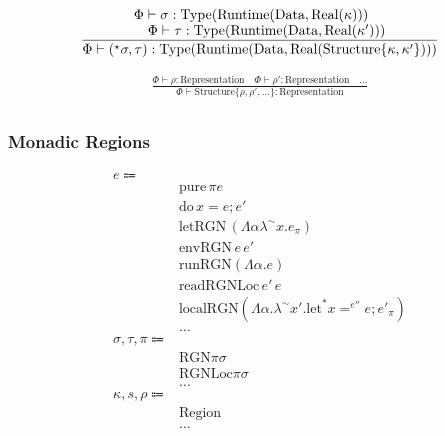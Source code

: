 \documentclass {article}
\begin{document}
\begin{gather*}
\frac
{\splitfrac{\Phi \vdash \sigma : \text{Type}(\text{Runtime}(\text{Data}, \text{Real}(\kappa)))}
{\Phi \vdash \tau : \text{Type} (\text{Runtime}(\text{Data}, \text{Real} (\kappa'))) }}
{\Phi \vdash (^\star \sigma, \tau) : \text{Type} (\text{Runtime} (\text{Data}, \text{Real} (\text{Structure} \{ \kappa,\kappa'\} )))} \\
\end{gather*}


\begin{gather*}
\frac
{\Phi \vdash \rho : \text{Representation} \quad \Phi \vdash \rho' : \text{Representation} \quad \dots}
{\Phi \vdash \text{Structure} \{ \rho, \rho', \dots \} : \text{Representation} } \\
\end{gather*}

\subsubsection{Monadic Regions}
\begin{align*}
e \Coloneqq & \\
& \text{pure} \, \pi e \tag{Pure Region Transformer}\\
& \text{do} \, x = e; e' \tag{Bind Region Transformer} \\
& \text{letRGN} \, (\Lambda \alpha \lambda^\sim x. e_\pi) \tag{Create Region} \\
& \text{envRGN} \, e \, e' \tag{Subtype Region} \\
& \text{runRGN} (\Lambda \alpha. e) \tag{Evaluate Region} \\
& \text{readRGNLoc} \, e' \, e \tag{Dereference Pointer} \\
& \text{localRGN} (\Lambda \alpha.\lambda^\sim x'. \text{let}^* x =^{e''} e; e'_\pi ) \tag{Allocate Stack Pointer} \\
& \dots \\
\sigma, \tau, \pi \Coloneqq & \\
& \text{RGN} \pi \sigma \tag{Region Transformer} \\
& \text{RGNLoc} \pi \sigma \tag{Reference} \\
& \dots \\
\kappa, s, \rho \Coloneqq & \\
& \text{Region} \tag{Region} \\
& \dots
\end{align*}
\end{document}
